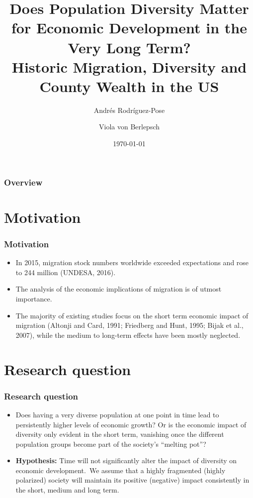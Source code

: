\documentclass[pdftex,12pt,xcolor=pdftex,table]{beamer}
\title[Population diversity and development]{Does Population Diversity Matter for Economic Development in the Very Long Term?  \\  Historic Migration, Diversity and County Wealth in the US
}
\author{Andrés Rodríguez-Pose \and
Viola von Berlepsch 
}
\institute[]{Economic Growth and Comparative Development Course \\  Sergio Briceño and Diana Ricciulli \\ Contact information: dc.ricciulli10@uniandes.edu.co}
\date{\today}
\begin{document}
\begin{frame}
\titlepage 
\end{frame}

\begin{frame}
\frametitle{Overview} 
\tableofcontents 
\end{frame}


\section{Motivation} 

\begin{frame}
\frametitle{Motivation}

\begin{itemize}
\item In 2015, migration stock numbers worldwide exceeded expectations and rose to 244 million (UNDESA, 2016).
\item The analysis of the economic implications of migration is of utmost importance.
\item The majority of existing studies focus on the short term economic impact of migration (Altonji and Card, 1991; Friedberg and Hunt, 1995; Bijak et al., 2007), while the medium to long-term effects have been mostly neglected.
\end{itemize}

\end{frame}

\section{Research question} 

\begin{frame}

\frametitle{Research question}
\begin{itemize}
\item Does having a very diverse population at one point in time lead to persistently higher levels of economic growth? Or is the economic impact of diversity only evident in the short term, vanishing once the different population groups become part of the society’s “melting pot”?
\medskip{}
\item \textbf{Hypothesis:} Time will not significantly alter the impact of diversity on economic development. We assume that a highly fragmented (highly polarized) society will maintain its positive (negative) impact consistently in the short, medium and long term.
\end{itemize}

\end{frame}
\end{document}
